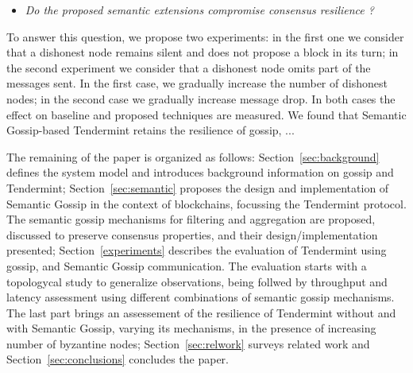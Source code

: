 \vspace{-2mm}
\begin{itemize}
\item[]  \emph{Do the proposed semantic extensions compromise consensus resilience ?}
\end{itemize}
\vspace{-2mm}

To answer this question, we propose two experiments: 
in the first one we consider that a dishonest node remains silent and does not propose a block in its turn; 
in the second experiment we consider that a dishonest node omits part of the messages sent.   
In the first case, we gradually increase the number of dishonest nodes; in the second case we gradually
increase message drop.  In both cases the effect on baseline and proposed techniques are measured.
%
We found that Semantic Gossip-based Tendermint retains the resilience of gossip, ... 


The remaining of the paper is organized as follows:
    Section~\ref{sec:background} defines the system model and introduces background information on gossip and Tendermint;
    Section~\ref{sec:semantic} proposes the design and implementation of Semantic Gossip in the context of blockchains, focussing the Tendermint protocol.  
    The semantic gossip mechanisms for filtering and aggregation are proposed,
    discussed to preserve consensus properties, and their design/implementation presented;
 Section~\ref{experiments} describes the evaluation of Tendermint using gossip, and Semantic Gossip communication.   The evaluation starts with a topologycal study to generalize observations, being follwed by throughput and latency assessment using different combinations of semantic gossip mechanisms.
    The last part brings an assessement of the resilience of Tendermint without and with Semantic Gossip, varying its mechanisms, in the presence of increasing number of byzantine nodes;
    Section~\ref{sec:relwork} surveys related work and Section~\ref{sec:conclusions} concludes the paper.
    